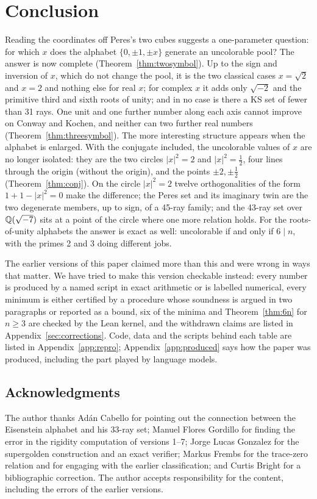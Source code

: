 \section{Conclusion}\label{sec:conclusion}

Reading the coordinates off Peres's two cubes suggests a one-parameter question: for which $x$
does the alphabet $\{0,\pm1,\pm x\}$ generate an uncolorable pool?  The answer is now complete
(Theorem~\ref{thm:twosymbol}).  Up to the sign and inversion of $x$, which do not change the pool, it is the two classical cases
$x=\sqrt2$ and $x=2$ and nothing else for real $x$; for complex $x$ it adds only $\sqrt{-2}$ and
the primitive third and sixth roots of unity; and in no case is there a KS set of fewer than 31 rays.  One unit and one
further number along each axis cannot improve on Conway and Kochen, and neither can two further
real numbers (Theorem~\ref{thm:threesymbol}).  The more interesting
structure appears when the alphabet is enlarged.  With the conjugate
included, the uncolorable values of $x$ are no longer isolated: they are the two circles
$|x|^2=2$ and $|x|^2=\tfrac12$, four lines through the origin (without the origin), and the points
$\pm2,\pm\tfrac12$ (Theorem~\ref{thm:conj}).  On the circle $|x|^2=2$ twelve orthogonalities of the form $1+1-|x|^2=0$ make the difference; the Peres set
and its imaginary twin are the two degenerate members, up to sign, of a 45-ray family; and the 43-ray set over
$\mathbb{Q}(\sqrt{-7})$ sits at a point of the circle where one more relation holds.  For the
roots-of-unity alphabets the answer is exact as well: uncolorable if and only if $6\mid n$, with
the primes 2 and 3 doing different jobs.

The earlier versions of this paper claimed more than this and were wrong in ways that matter.
We have tried to make this version checkable instead: every number is produced by a named script
in exact arithmetic or is labelled numerical, every minimum is either certified by a procedure
whose soundness is argued in two paragraphs or reported as a bound, six of the minima and
Theorem~\ref{thm:6n} for $n\ge3$ are checked by the Lean kernel, and the withdrawn claims are listed in
Appendix~\ref{sec:corrections}.  Code, data and the scripts behind each table are listed in
Appendix~\ref{app:repro}; Appendix~\ref{app:produced} says how the paper was produced, including
the part played by language models.

\subsection*{Acknowledgments}

The author thanks Ad\'an Cabello for pointing out the connection between the Eisenstein alphabet
and his 33-ray set; Manuel Flores Gordillo for finding the error in the rigidity computation of
versions 1--7; Jorge Lucas Gonzalez for the supergolden construction and an exact verifier;
Markus Frembs for the trace-zero relation and for engaging with the earlier classification; and
Curtis Bright for a bibliographic correction.  The author accepts responsibility for the content,
including the errors of the earlier versions.
